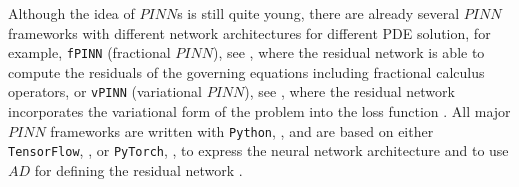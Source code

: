 Although the idea of $PINN$s is still quite young, there are already several $PINN$ frameworks with different network architectures for different PDE solution, for example, \lstinline!fPINN! (fractional $PINN$), see \cite{PangLuKarniadakis:2019}, where the residual network is able to compute the residuals of the governing equations including fractional calculus operators, or \lstinline!vPINN! (variational $PINN$), see \cite{KharazmiZhangKarniadakis:2019}, where the residual network incorporates the variational form of the problem into the loss function \cite[pp.~5-6]{Markidis:2021}. All major $PINN$ frameworks are written with \lstinline!Python!, \cite{Python}, and are based on either \lstinline!TensorFlow!, \cite{TensorFlow}, or \lstinline!PyTorch!, \cite{PyTorch}, to express the neural network architecture and to use $AD$ for defining the residual network \cite[p.~6]{Markidis:2021}. 

